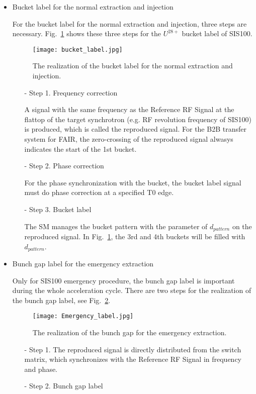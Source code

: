 \begin{itemize}
\item Bucket label for the normal extraction and injection

For the bucket label for the normal extraction and injection, three steps are necessary. Fig.~\ref{bucket_label} shows these three steps for the $U^{28+}$ bucket label of SIS100.
\begin{figure}[!htb]
   \centering   
   \texttt{[image: bucket\_label.jpg]}
   \caption{The realization of the bucket label for the normal extraction and injection.}
   \label{bucket_label}
\end{figure}  
\begin{itemize}
\item[-] Step 1. Frequency correction

A signal with the same frequency as the Reference RF Signal at the flattop of the target synchrotron (e.g. RF revolution frequency of SIS100) is produced, which is called the reproduced signal. For the B2B transfer system for FAIR, the zero-crossing of the reproduced signal alwasys indicates the start of the 1st bucket.
\item[-] Step 2. Phase correction

For the phase synchronization with the bucket, the bucket label signal must do phase correction at a specified T0 edge.

\item[-] Step 3. Bucket label

The SM manages the bucket pattern with the parameter of $d_{pattern}$ on the reproduced signal. In Fig.~\ref{bucket_label}, the 3rd and 4th buckets will be filled with $d_{pattern}$.
\end{itemize}

\item Bunch gap label for the emergency extraction

Only for SIS100 emergency procedure, the bunch gap label is important during the whole acceleration cycle. There are two steps for the realization of the bunch gap label, see Fig.~\ref{Emergency_label}.
\begin{figure}[!htb]
   \centering   
   \texttt{[image: Emergency\_label.jpg]}
   \caption{The realization of the bunch gap for the emergency extraction.}
   \label{Emergency_label}
\end{figure} 

\begin{itemize}
\item[-] Step 1. The reproduced signal is directly distributed from the switch matrix, which synchronizes with the Reference RF Signal in frequency and phase.
\item[-] Step 2. Bunch gap label


\end{itemize}
\end{itemize}
